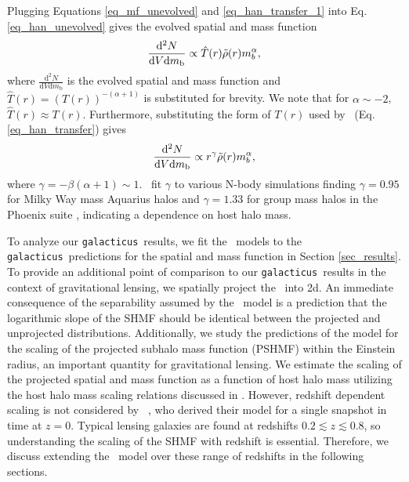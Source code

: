 \documentclass[%
 reprint,
 amsmath,
 amssymb,
 aps,
prd,
twocolumn,
superscriptaddress,
preprintnumbers,
floatfix,
nofootinbib
]{revtex4-2}
\def\gal{{\tt galacticus}~}
\def\hanetal{\citet{10.1093/mnras/stv2900}~}
\def\hanetalns{\citet{10.1093/mnras/stv2900}}
\newcommand{\refsec}[1]{Section \ref{#1}}
\newcommand{\refeq}[1]{Eq. \ref{#1}}
\begin{document}
Plugging Equations \ref{eq_mf_unevolved} and \ref{eq_han_transfer_1} into \refeq{eq_han_unevolved} gives the evolved spatial and mass function
\begin{equation}\label{eq_han_evolved}
    \frac{\mathrm{d}^{2}N}{\mathrm{d}V\mathrm{d}m_{\mathrm{b}}} \propto \hat{T}(r) \Tilde{\rho}(r) m_{b}^{\alpha},
\end{equation}
where $\frac{\mathrm{d}^{2}N}{\mathrm{d}V\mathrm{d}m_{\mathrm{b}}}$ is the evolved spatial and mass function and $\hat{T}(r) =\left( T(r) \right)^{-(\alpha + 1)}$  is substituted for brevity.
We note that for $\alpha \sim -2$, $\hat{T}(r) \approx T(r)$.
Furthermore, substituting the form of $T(r)$ used by \hanetal (\refeq{eq_han_transfer}) gives 
\begin{equation}\label{eq_han_evolved_2}
    \frac{\mathrm{d}^{2}N}{\mathrm{d}V\mathrm{d}m_{\mathrm{b}}} \propto r^{\gamma} \Tilde{\rho}(r) m_{b}^{\alpha},
\end{equation}
where $\gamma = - \beta (\alpha + 1) \sim 1$. 
\hanetal  fit $\gamma$ to various N-body simulations finding $\gamma = 0.95$ for Milky Way mass Aquarius halos \citep{10.1111/j.1365-2966.2008.14066.x} and $\gamma = 1.33$ for group mass halos in the Phoenix suite \citep{2016ApJ...824..144F}, indicating a dependence on host halo mass.



To analyze our \gal results, we fit the \hanetal models to the \gal predictions for the spatial and mass function in \refsec{sec_results}.
To provide an additional point of comparison to our \gal results in the context of gravitational lensing, we spatially project the \hanetal into 2d.
An immediate consequence of the separability assumed by the  \hanetal model is a prediction that the logarithmic slope of the SHMF should be identical between the projected and unprojected distributions.
Additionally, we study the predictions of the model for the scaling of the projected subhalo mass function (PSHMF) within the Einstein radius, an important quantity for gravitational lensing.
We estimate the scaling of the projected spatial and mass function as a function of host halo mass utilizing the host halo mass scaling relations discussed in \hanetalns.
However, redshift dependent scaling is not considered by \hanetal, who derived their model for a single snapshot in time at $z = 0$.
Typical lensing galaxies are found at redshifts $0.2 \lesssim z \lesssim 0.8$, so understanding the scaling of the SHMF with redshift is essential.
Therefore, we discuss extending the \hanetal model over these range of redshifts in the following sections.
\end{document}
